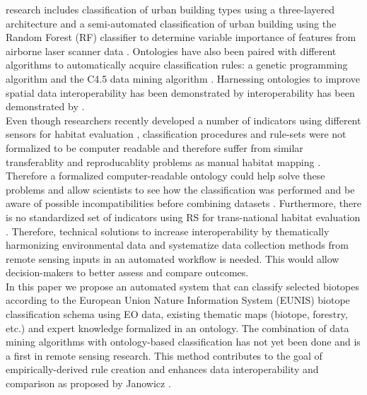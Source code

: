 \documentclass[authoryear, review,12pt,number]{elsarticle}
\begin{document}
research includes classification of urban building types using a three-layered 
architecture \citep{diSciascio2013} and a semi-automated classification of 
urban building using the Random Forest (RF) classifier to determine variable 
importance of features from airborne laser scanner data \citep{Belgiu2014}. 
Ontologies have also been paired with different algorithms to automatically 
acquire classification rules: a genetic programming algorithm 
\citep{Forestier2012470} and the C4.5 data mining algorithm 
\citep{Sheeren2006ML}.
Harnessing ontologies to improve spatial data interoperability has been 
demonstrated by interoperability has been demonstrated by \cite{Nieland2015}. 
\\
Even though researchers recently developed a number of indicators using
different sensors for habitat evaluation \citep{Nagendra2013}, classification
procedures and rule-sets were not formalized to be computer readable and
therefore suffer from similar transferablity and reproducablity problems as
manual habitat mapping \citep{Arvor2013, Nieland2015}.
Therefore a formalized computer-readable ontology could help solve these
problems and allow scientists to see how the classification was performed and 
be aware of possible incompatibilities before combining datasets
\citep{Janowicz2012}. 
Furthermore, there is no standardized set of indicators
using RS for trans-national habitat evaluation \citep{Lucas2015}. Therefore,
technical solutions to increase interoperability by thematically harmonizing
environmental data and systematize data collection methods from remote sensing
inputs in an automated workflow is needed. This would allow decision-makers 
to better assess and compare outcomes.
\\
In this paper we propose an automated system that can
classify selected biotopes according to the European Union Nature Information
System (EUNIS) biotope classification schema using EO data, existing
thematic maps (biotope, forestry, etc.) and expert knowledge formalized in an
ontology. 
The combination of data mining algorithms with ontology-based classification
has not yet been done and is a first in remote sensing research. This method
contributes to the goal of empirically-derived rule creation and enhances
data interoperability and comparison as proposed by Janowicz
\citep{Janowicz2012}.
\end{document}
